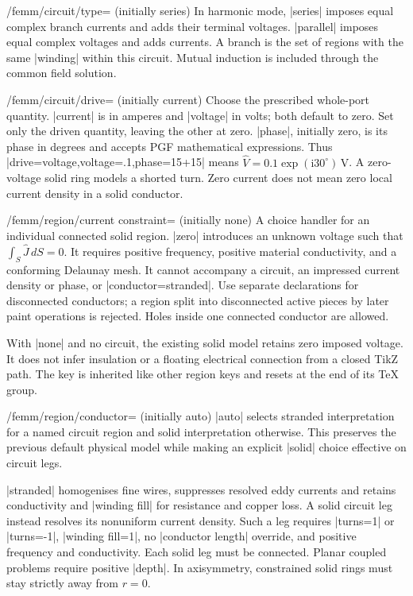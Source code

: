 \begin{key}{/femm/circuit/type= (initially series)}
In harmonic mode, |series| imposes equal complex branch currents and adds their
terminal voltages. |parallel| imposes equal complex voltages and adds currents.
A branch is the set of regions with the same |winding| within this circuit.
Mutual induction is included through the common field solution.
\end{key}
\begin{key}{/femm/circuit/drive= (initially current)}
Choose the prescribed whole-port quantity. |current| is in amperes and
|voltage| in volts; both default to zero. Set only the driven quantity, leaving
the other at zero. |phase|, initially zero, is its phase in degrees and accepts
PGF mathematical expressions. Thus |drive=voltage,voltage=.1,phase=15+15|
means $\widehat V=0.1\exp(\mathrm i30^\circ)\,\mathrm V$. A zero-voltage
solid ring models a shorted turn. Zero current does not mean zero local current
density in a solid conductor.
\end{key}
\begin{key}{/femm/region/current constraint= (initially none)}
A choice handler for an individual connected solid region. |zero| introduces
an unknown voltage such that $\int_S\widehat J\,dS=0$. It requires positive
frequency, positive material conductivity, and a conforming Delaunay mesh.
It cannot accompany a circuit, an impressed current density or phase, or
|conductor=stranded|. Use separate declarations for disconnected conductors;
a region split into disconnected active pieces by later paint operations is
rejected. Holes inside one connected conductor are allowed.

With |none| and no circuit, the existing solid model retains zero imposed
voltage. It does not infer insulation or a floating electrical connection from
a closed TikZ path. The key is inherited like other region keys and resets
at the end of its TeX group.
\end{key}
\begin{key}{/femm/region/conductor= (initially auto)}
|auto| selects stranded interpretation for a named circuit region and solid
interpretation otherwise. This preserves the previous default physical model
while making an explicit |solid| choice effective on circuit legs.

|stranded| homogenises fine wires, suppresses resolved eddy currents and retains
conductivity and |winding fill| for resistance and copper loss. A solid circuit
leg instead resolves its nonuniform current density. Such a leg requires
|turns=1| or |turns=-1|, |winding fill=1|, no |conductor length| override, and
positive frequency and conductivity. Each solid leg must be connected. Planar
coupled problems require positive |depth|. In axisymmetry, constrained solid
rings must stay strictly away from $r=0$.
\end{key}

